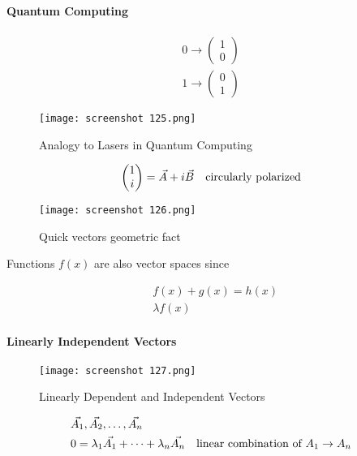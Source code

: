 \documentclass[svgnames]{article}   	%
\begin{document}
\paragraph{Quantum Computing} 

\begin{align*}
  0 \rightarrow \begin{pmatrix} 1 \\ 0 \end{pmatrix} \\
  1 \rightarrow \begin{pmatrix} 0 \\ 1 \end{pmatrix}
\end{align*}


\begin{figure}[H]
  \centering
    \texttt{[image: screenshot 125.png]}
    \caption{Analogy to Lasers in Quantum Computing}
\end{figure}



\[
\begin{pmatrix}
  1 \\ i 
\end{pmatrix} = \vec{A} + i\vec{B} \hspace{10px} \text{circularly polarized}  
\]
\begin{figure}[H]
  \centering
    \texttt{[image: screenshot 126.png]}
    \caption{Quick vectors geometric fact}
\end{figure}



Functions $f(x)$ are also vector spaces since 

\begin{align*}
  & f(x) + g(x) = h(x) \\
  & \lambda f(x) 
\end{align*}

\paragraph{Linearly Independent Vectors} 
\begin{figure}[H]
  \centering
    \texttt{[image: screenshot 127.png]}
    \caption{Linearly Dependent and Independent Vectors}
\end{figure}



\begin{align*}
  &\vec{A_1}, \vec{A_2}, \dots, \vec{A_n} \\ 
  &0 = \lambda_1 \vec{A_1} + \dots + \lambda_n \vec{A_n} \hspace{10px}
  \text{linear combination of $A_1 \rightarrow A_n$}
\end{align*}
\end{document}
